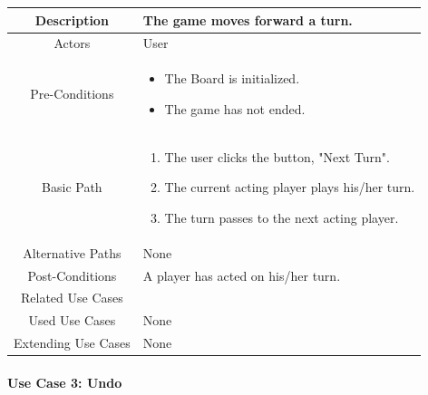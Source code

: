 \documentclass[10pt, a4paper]{article}
\begin{document}
			\begin{center}
				\begin{tabular}{ |c|p{10cm}| } 
					\hline
					Description & The game moves forward a turn. \\
					\hline 
					Actors & User \\
					\hline  
					Pre-Conditions & \begin{itemize}[noitemsep,topsep=0pt]
						\item The Board is initialized.
						\item The game has not ended.
					\end{itemize} \\
					\hline  
					Basic Path & 
					\begin{enumerate}
						\item The user clicks the button, "Next Turn".
						\item The current acting player plays his/her turn.
						\item The turn passes to the next acting player.
					\end{enumerate}\\
					\hline
					Alternative Paths & None \\
					\hline
					Post-Conditions & A player has acted on his/her turn.\\
					\hline 
					Related Use Cases & \\
					\hline 
					Used Use Cases & None\\
					\hline 
					Extending Use Cases & None \\
					\hline 
				\end{tabular}
			\end{center}
		
			\paragraph{Use Case 3: Undo}
			
\end{document}
